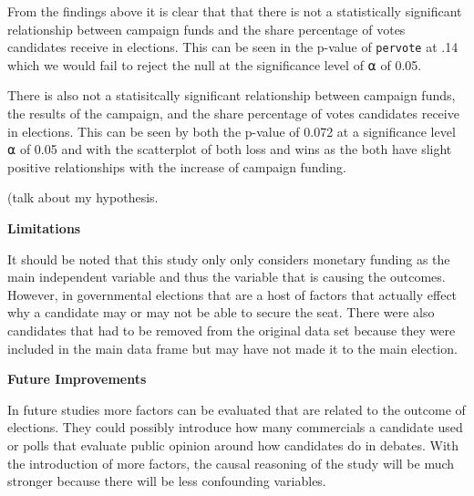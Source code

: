 \documentclass[
]{article}
\begin{document}
From the findings above it is clear that that there is not a
statistically significant relationship between campaign funds and the
share percentage of votes candidates receive in elections. This can be
seen in the p-value of \texttt{pervote} at .14 which we would fail to
reject the null at the significance level of ⍺ of 0.05.

There is also not a statisitcally significant relationship between
campaign funds, the results of the campaign, and the share percentage of
votes candidates receive in elections. This can be seen by both the
p-value of 0.072 at a significance level ⍺ of 0.05 and with the
scatterplot of both loss and wins as the both have slight positive
relationships with the increase of campaign funding.

(talk about my hypothesis.

\textbf{Limitations}

It should be noted that this study only only considers monetary funding
as the main independent variable and thus the variable that is causing
the outcomes. However, in governmental elections that are a host of
factors that actually effect why a candidate may or may not be able to
secure the seat. There were also candidates that had to be removed from
the original data set because they were included in the main data frame
but may have not made it to the main election.

\textbf{Future Improvements}

In future studies more factors can be evaluated that are related to the
outcome of elections. They could possibly introduce how many commercials
a candidate used or polls that evaluate public opinion around how
candidates do in debates. With the introduction of more factors, the
causal reasoning of the study will be much stronger because there will
be less confounding variables.
\end{document}
